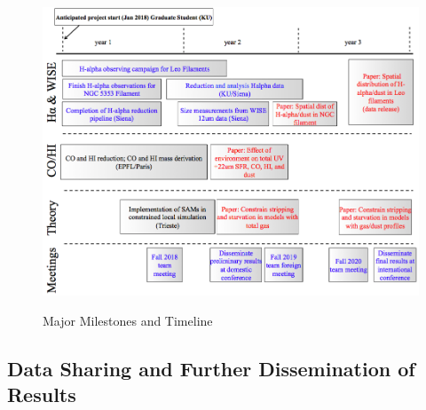 \documentclass[11pt, preprint]{aastex}
\begin{document}
{%




%
%


\begin{figure}[h]
\caption{Major Milestones and Timeline \label{schedule}}
\includegraphics[width=\textwidth]{work-plan.png}
\label{fig:workplan}
\end{figure}

\vspace*{-.8cm}\subsection{Data Sharing and Further Dissemination of Results }
\vspace*{-.3cm}

}
\end{document}
